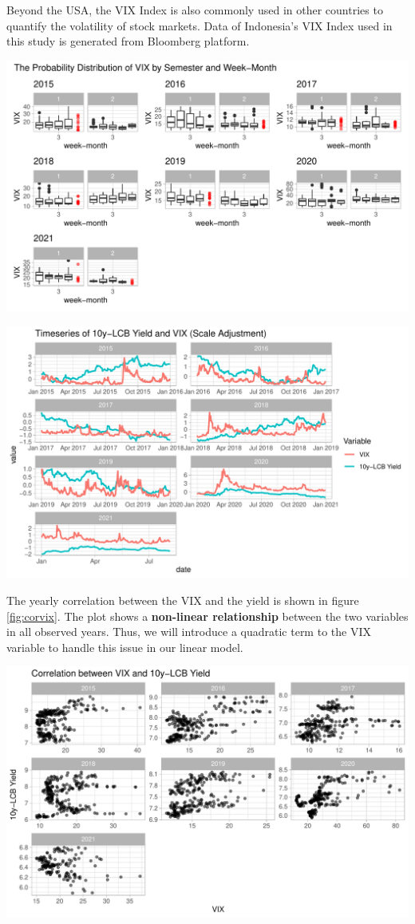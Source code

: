 \documentclass[11pt,a4paper,]{article}
\begin{document}
Beyond the USA, the VIX Index is also commonly used in other countries to quantify the volatility of stock markets. Data of Indonesia's VIX Index used in this study is generated from Bloomberg platform.

\includegraphics{Untitled_files/figure-latex/unnamed-chunk-14-1.pdf}

\includegraphics{Untitled_files/figure-latex/unnamed-chunk-15-1.pdf}

The yearly correlation between the VIX and the yield is shown in figure \ref{fig:corvix}. The plot shows a \textbf{non-linear relationship} between the two variables in all observed years. Thus, we will introduce a quadratic term to the VIX variable to handle this issue in our linear model.

\includegraphics{Untitled_files/figure-latex/corvix-1.pdf}
\end{document}
